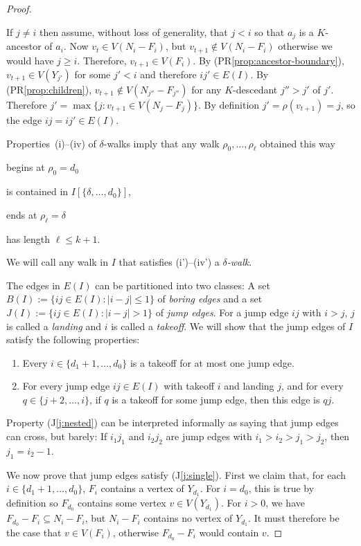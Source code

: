 \documentclass{patmorin}
\renewcommand{\propref}[1]{(PR\ref{prop:#1})}
\newcommand{\jlabel}[1]{\label{j:#1}}
\newcommand{\jref}[1]{(J\ref{j:#1})}
\begin{document}
\begin{proof}
\begin{compactenum}
    \item If $j\neq i$ then assume, without loss of generality, that $j < i$ so that $a_j$ is a $K$-ancestor of $a_i$.  Now $v_t\in V(N_i-F_i)$, but $v_{t+1}\not\in V(N_i-F_i)$ otherwise we would have $j\ge i$. Therefore, $v_{t+1}\in V(F_i)$.  By \propref{ancestor-boundary}, $v_{t+1}\in V(Y_{j'})$ for some $j'< i$ and therefore $ij'\in E(I)$.  By \propref{children}, $v_{t+1}\not\in V(N_{j''}-F_{j''})$ for any $K$-descedant $j''>j'$ of $j'$.  Therefore $j'=\max\{j : v_{t+1}\in V(N_j-F_j)\}$. By definition $j'=\rho(v_{t+1})=j$, so the edge $ij=ij'\in E(I)$. 
  \end{compactenum}

  Properties~(i)--(iv) of $\delta$-walks imply that any walk $\rho_0,\ldots,\rho_\ell$ obtained this way 
  \begin{compactenum}[(i')]
    \item begins at $\rho_0=d_0$ 
    \item is contained in $I[\{\delta,\ldots,d_0\}]$, 
    \item ends at $\rho_\ell=\delta$
    \item has length $\ell \le k+1$.
  \end{compactenum}
  We will call any walk in $I$ that satisfies (i')--(iv') a \emph{$\delta$-walk}.
  
  The edges in $E(I)$ can be partitioned into two classes:  A set $B(I):=\{ij\in E(I): |i-j|\le 1\}$ of \emph{boring edges} and a set $J(I):=\{ij\in E(I): |i-j|>1\}$ of \emph{jump edges}.  For a jump edge $ij$ with $i>j$, $j$ is called a \emph{landing} and $i$ is called a \emph{takeoff}.  We will show that the jump edges of $I$ satisfy the following properties:
  \begin{enumerate}[(J1)]
    \item \jlabel{single} Every $i\in\{d_1+1,\ldots,d_0\}$ is a takeoff for at most one jump edge.
    
    \item \jlabel{nested} For every jump edge $ij\in E(I)$ with takeoff $i$ and landing $j$, and for every $q\in\{j+2,\ldots,i\}$, if $q$ is a takeoff for some jump edge, then this edge is $qj$.
  \end{enumerate}
  Property \jref{nested} can be interpreted informally as saying that jump edges can cross, but barely:  If $i_1j_1$ and $i_2j_2$ are jump edges with $i_1> i_2>j_1>j_2$, then $j_1=i_2-1$.

  We now prove that jump edges satisfy \jref{single}.
  First we claim that, for each $i\in\{d_1+1,\ldots,d_0\}$, $F_{i}$ contains a vertex of $Y_{d_1}$.  For $i=d_0$, this is true by definition so $F_{d_0}$ contains some vertex $v\in V(Y_{d_1})$.  For $i>0$, we have $F_{d_0}-F_{i}\subseteq N_i-F_i$, but $N_i-F_i$ contains no vertex of $Y_{d_1}$. It must therefore be the case that $v\in V(F_i)$, otherwise $F_{d_0}-F_i$ would contain $v$. 
  

\end{proof}
\end{document}
